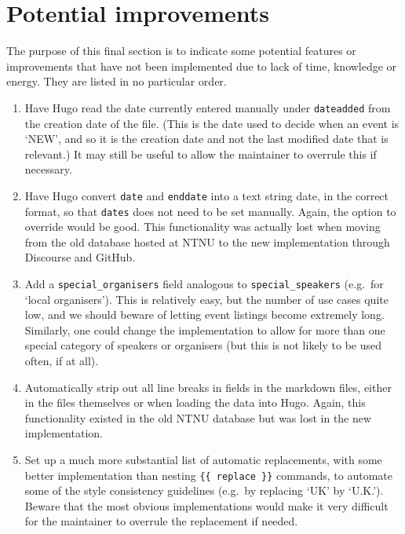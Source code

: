 \documentclass[12pt]{scrartcl}
\theoremstyle{definition}
\begin{document}
\section{Potential improvements}
The purpose of this final section is to indicate some potential features or improvements that have not been implemented due to lack of time, knowledge or energy.
They are listed in no particular order.

\begin{enumerate}
\item Have Hugo read the date currently entered manually under \verb|dateadded| from the creation date of the file.
(This is the date used to decide when an event is `NEW', and so it is the creation date and not the last modified date that is relevant.)
It may still be useful to allow the maintainer to overrule this if necessary.
\item Have Hugo convert \verb|date| and \verb|enddate| into a text string date, in the correct format, so that \verb|dates| does not need to be set manually.
Again, the option to override would be good.
This functionality was actually lost when moving from the old database hosted at NTNU to the new implementation through Discourse and GitHub.
\item Add a \verb|special_organisers| field analogous to \verb|special_speakers| (e.g.\ for `local organisers').
This is relatively easy, but the number of use cases quite low, and we should beware of letting event listings become extremely long.
Similarly, one could change the implementation to allow for more than one special category of speakers or organisers (but this is not likely to be used often, if at all).
\item Automatically strip out all line breaks in fields in the markdown files, either in the files themselves or when loading the data into Hugo. Again, this functionality existed in the old NTNU database but was lost in the new implementation.
\item Set up a much more substantial list of automatic replacements, with some better implementation than nesting \verb|{{ replace }}| commands, to automate some of the style consistency guidelines (e.g.\ by replacing `UK' by `U.K.'). Beware that the most obvious implementations would make it very difficult for the maintainer to overrule the replacement if needed.
\end{enumerate}
\end{document}
